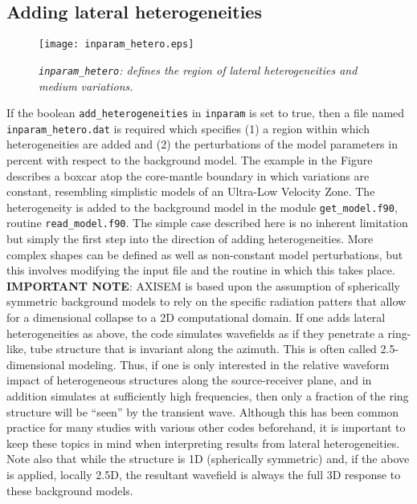 \documentclass[11pt,letter,fleqn,english,notitlepage]{article}
\begin{document}
\subsection{Adding lateral heterogeneities}
\begin{figure*}[htb]
\begin{center}
\texttt{[image: inparam\_hetero.eps]}
\caption{\textit{{\tt inparam\_hetero}: defines the region of lateral heterogeneities and medium variations.}}
\end{center}
\end{figure*}
\noindent 
If the boolean {\tt add\_heterogeneities} in {\tt inparam} is set to true, then a file named {\tt inparam\_hetero.dat} is required 
which specifies (1) a region within which heterogeneities are added and (2) the perturbations of the model parameters in 
percent with respect to the background model. The example in the Figure describes a boxcar atop the core-mantle boundary
in which variations are constant, resembling simplistic models of an Ultra-Low Velocity Zone. The heterogeneity is added 
to the background model in the module {\tt get\_model.f90}, routine {\tt read\_model.f90}. The simple case described 
here is no inherent limitation but simply the first step into the direction of adding heterogeneities. More complex 
shapes can be defined as well as non-constant model perturbations, but this involves modifying the input file and the routine 
in which this takes place. \\

\noindent \textbf{IMPORTANT NOTE}: AXISEM is based upon the assumption of spherically symmetric background models to 
rely on the specific radiation patters that allow for a dimensional collapse to a 2D computational domain. 
If one adds lateral heterogeneities as above, the code simulates wavefields as if they penetrate a ring-like, tube structure 
that is invariant along the azimuth. This is often called 2.5-dimensional modeling. Thus, if one is only interested in 
the relative waveform impact of heterogeneous structures along the source-receiver plane, and in addition simulates 
at sufficiently high frequencies, then only a fraction of the ring structure will be ``seen'' by the transient wave. Although 
this has been common practice for many studies with various other codes beforehand, it 
is important to keep these topics in mind when interpreting results from lateral heterogeneities. Note also that while 
the structure is 1D (spherically symmetric) and, if the above is applied, locally 2.5D, the resultant wavefield is always 
the full 3D response to these background models.
\end{document}
